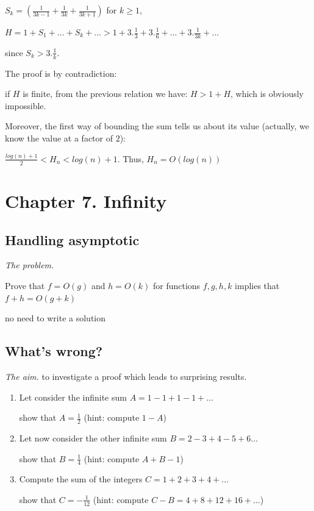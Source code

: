 $S_k = (\frac{1}{3k-1} + \frac{1}{3k} + \frac{1}{3k+1} )$ for $k\geq1$, 

$H = 1 + S_1 + ... + S_k + ... > 1 + 3.\frac{1}{3} + 3.\frac{1}{6} + ... + 3.\frac{1}{3k} + ... $

since $S_k > 3.\frac{1}{k} $.

The proof is by contradiction:

if $H$ is finite, from the previous relation we have: $H > 1 + H$, which is obviously impossible.
\medskip

Moreover, the first way of  bounding the sum tells us about its value (actually, we know the value at a factor of $2$):

$\frac{log(n)+1}{2} < H_n < log(n)+1$. Thus, $H_n = O(log(n))$




\section{Chapter 7. Infinity}

\subsection{Handling asymptotic}


\noindent \textit{The problem.}

Prove that $f = O(g)$ and $h = O(k)$ for functions $f,g,h,k$ implies that
$f+h = O(g+k)$
\medskip

{\Denis no need to write a solution}


\subsection{What's wrong?}

\noindent \textit{The aim.}
to investigate a proof which leads to surprising results.


\begin{enumerate}
\item
Let consider the infinite sum $A = 1-1+1-1+ \ldots$

show that $A=\frac{1}{2}$ (hint: compute $1-A$)
\item
Let now consider the other infinite sum $B=2-3+4-5+6 \ldots$

show that $B=\frac{1}{4}$ (hint: compute $A+B-1$)
\item 
Compute the sum of the integers $C=1+2+3+4+ \ldots$

show that $C=-\frac{1}{12}$ (hint: compute $C-B=4+8+12+16+ \ldots$)
\end{enumerate}

